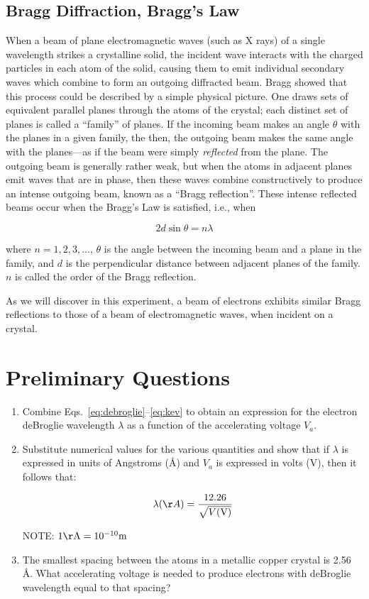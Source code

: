 \subsection{Bragg Diffraction, Bragg's Law}

When a beam of plane electromagnetic waves (such as X rays) of a single
wavelength strikes a crystalline solid, the incident wave interacts
with the charged particles in each atom of the solid, causing them to
emit individual secondary waves which combine to form an outgoing
diffracted beam.  Bragg showed that this process could be described by
a simple physical picture.  One draws sets of equivalent parallel
planes through the atoms of the crystal; each distinct set of planes is
called a ``family'' of planes.  If
the incoming beam makes an angle $\theta$ with the planes in a given
family, the then, the outgoing beam makes the same angle with the
planes---as if the beam were simply {\em reflected} from the plane.
 The outgoing beam is generally rather weak, but when the atoms in
adjacent planes emit waves that are in phase, then these waves combine
constructively to produce an intense outgoing beam, known as a
``Bragg reflection''.  These intense
reflected beams occur when the Bragg's Law is
satisfied, i.e., when 

\begin{equation}
2 d \sin\theta = n\lambda
\label{eq:bragglaw}
\end{equation}

where $n = 1,2,3,\ldots$, $\theta$ is the angle between the incoming beam and a plane in the
family, and $d$ is the perpendicular distance between adjacent planes of
the family.  $n$ is called the order of the Bragg reflection.

As we will discover in this experiment, a beam of electrons exhibits
similar Bragg reflections to those of a beam of electromagnetic waves,
when incident on a crystal.

\section{Preliminary Questions}
\begin{enumerate}
\item Combine Eqs.~\ref{eq:debroglie}--\ref{eq:kev} to obtain an expression for the electron deBroglie
wavelength ${\lambda}$ as a 
function of the accelerating voltage $V_a$.

\item Substitute numerical values for the various quantities and show
that if $\lambda$ is expressed in units of Angstroms (\AA) and $V_a$ is
expressed in volts (V), then it follows that:

\begin{equation}
\lambda(\AA) = {12.26 \over \sqrt{V({\rm V})} }
\end{equation}

NOTE: $1 {\rm \AA} = 10^{-10} {\rm m}$

\item The smallest spacing between the atoms in a metallic copper crystal
is 2.56  \AA. What accelerating voltage is needed
to produce electrons with deBroglie wavelength equal to that spacing?
\end{enumerate}

